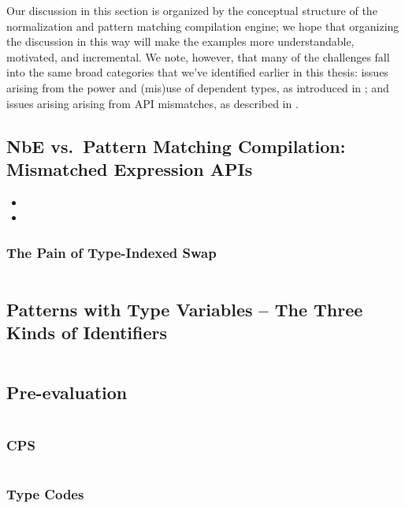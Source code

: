 Our discussion in this section is organized by the conceptual structure of the normalization and pattern matching compilation engine;
we hope that organizing the discussion in this way will make the examples more understandable, motivated, and incremental.
We note, however, that many of the challenges fall into the same broad categories that we've identified earlier in this thesis:
issues arising from the power and (mis)use of dependent types, as introduced in ;
and issues arising arising from API mismatches, as described in .

\subsection{NbE vs.~Pattern Matching Compilation: Mismatched Expression APIs}
\begin{itemize}
\item {}
\item {}
\end{itemize}
\subsubsection{The Pain of Type-Indexed Swap}
$\left.\right.$

\subsection{Patterns with Type Variables -- The Three Kinds of Identifiers}
$\left.\right.$

\subsection{Pre-evaluation}
$\left.\right.$
\subsubsection{CPS}
$\left.\right.$
\subsubsection{Type Codes}
$\left.\right.$
